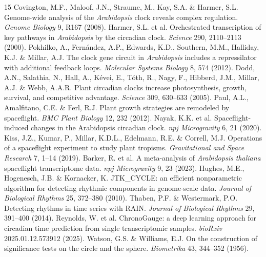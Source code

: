\documentclass[11pt,a4paper]{article}
\begin{document}
\begin{thebibliography}{15}
 Covington, M.F., Maloof, J.N., Straume, M., Kay, S.A. \& Harmer, S.L. Genome-wide analysis of the \textit{Arabidopsis} clock reveals complex regulation. \textit{Genome Biology} 9, R167 (2008).
 Harmer, S.L. et al. Orchestrated transcription of key pathways in \textit{Arabidopsis} by the circadian clock. \textit{Science} 290, 2110--2113 (2000).
 Pokhilko, A., Fern\'andez, A.P., Edwards, K.D., Southern, M.M., Halliday, K.J. \& Millar, A.J. The clock gene circuit in \textit{Arabidopsis} includes a repressilator with additional feedback loops. \textit{Molecular Systems Biology} 8, 574 (2012).
 Dodd, A.N., Salathia, N., Hall, A., K\'evei, E., T\'oth, R., Nagy, F., Hibberd, J.M., Millar, A.J. \& Webb, A.A.R. Plant circadian clocks increase photosynthesis, growth, survival, and competitive advantage. \textit{Science} 309, 630--633 (2005).
 Paul, A.L., Amalfitano, C.E. \& Ferl, R.J. Plant growth strategies are remodeled by spaceflight. \textit{BMC Plant Biology} 12, 232 (2012).
 Nayak, K.K. et al. Spaceflight-induced changes in the Arabidopsis circadian clock. \textit{npj Microgravity} 6, 21 (2020).
 Kiss, J.Z., Kumar, P., Millar, K.D.L., Edelmann, R.E. \& Correll, M.J. Operations of a spaceflight experiment to study plant tropisms. \textit{Gravitational and Space Research} 7, 1--14 (2019).
 Barker, R. et al. A meta-analysis of \textit{Arabidopsis thaliana} spaceflight transcriptome data. \textit{npj Microgravity} 9, 23 (2023).
 Hughes, M.E., Hogenesch, J.B. \& Kornacker, K. JTK\_CYCLE: an efficient nonparametric algorithm for detecting rhythmic components in genome-scale data. \textit{Journal of Biological Rhythms} 25, 372--380 (2010).
 Thaben, P.F. \& Westermark, P.O. Detecting rhythms in time series with RAIN. \textit{Journal of Biological Rhythms} 29, 391--400 (2014).
 Reynolds, W. et al. ChronoGauge: a deep learning approach for circadian time prediction from single transcriptomic samples. \textit{bioRxiv} 2025.01.12.573912 (2025).
 Watson, G.S. \& Williams, E.J. On the construction of significance tests on the circle and the sphere. \textit{Biometrika} 43, 344--352 (1956).

\end{thebibliography}
\end{document}
